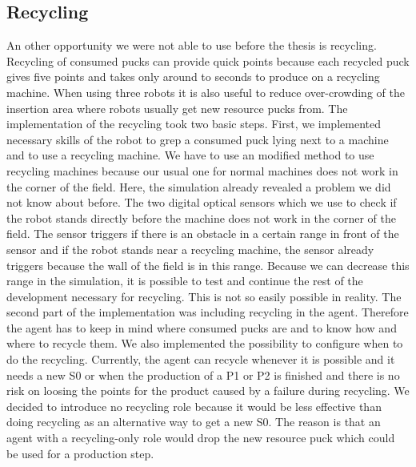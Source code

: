\subsection{Recycling}
An other opportunity we were not able to use before the thesis is recycling. Recycling of consumed pucks can provide quick points because each recycled puck gives five points and takes only around to seconds to produce on a recycling machine. When using three robots it is also useful to reduce over-crowding of the insertion area where robots usually get new resource pucks from. The implementation of the recycling took two basic steps. First, we implemented necessary skills of the robot to grep a consumed puck lying next to a machine and to use a recycling machine. We have to use an modified method to use recycling machines because our usual one for normal machines does not work in the corner of the field. Here, the simulation already revealed a problem we did not know about before. The two digital optical sensors which we use to check if the robot stands directly before the machine does not work in the corner of the field. The sensor triggers if there is an obstacle in a certain range in front of the sensor and if the robot stands near a recycling machine, the sensor already triggers because the wall of the field is in this range. Because we can decrease this range in the simulation, it is possible to test and continue the rest of the development necessary for recycling. This is not so easily possible in reality. The second part of the implementation was including recycling in the agent. Therefore the agent has to keep in mind where consumed pucks are and to know how and where to recycle them. We also implemented the possibility to configure when to do the recycling. Currently, the agent can recycle whenever it is possible and it needs a new S0 or when the production of a P1 or P2 is finished and there is no risk on loosing the points for the product caused by a failure during recycling. We decided to introduce no recycling role because it would be less effective than doing recycling as an alternative way to get a new S0. The reason is that an agent with a recycling-only role would drop the new resource puck which could be used for a production step.


